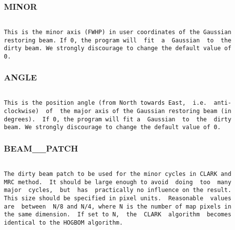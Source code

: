 \subsubsection{MINOR}
\begin{verbatim}

This is the minor axis (FWHP) in user coordinates of the Gaussian
restoring beam. If 0, the program will  fit  a  Gaussian  to  the
dirty beam. We strongly discourage to change the default value of
0.

\end{verbatim}
\subsubsection{ANGLE}
\begin{verbatim}

This is the position angle (from North towards East,  i.e.  anti-
clockwise)  of  the major axis of the Gaussian restoring beam (in
degrees).  If 0, the program will fit a  Gaussian  to  the  dirty
beam. We strongly discourage to change the default value of 0.

\end{verbatim}
\subsubsection{BEAM\_\_PATCH}
\begin{verbatim}

The dirty beam patch to be used for the minor cycles in CLARK and
MRC method.  It should be large enough to avoid  doing  too  many
major  cycles,  but  has  practically no influence on the result.
This size should be specified in pixel units.  Reasonable  values
are  between  N/8 and N/4, where N is the number of map pixels in
the same dimension.  If set to N,  the  CLARK  algorithm  becomes
identical to the HOGBOM algorithm.




















































\end{verbatim}
